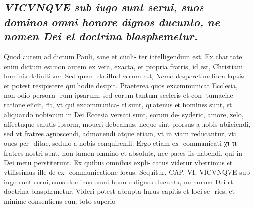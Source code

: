 \documentclass{article}
\begin{document}
\begin{pages}
\subsection*{\textit{VICVNQVE sub iugo sunt serui, suos dominos omni honore dignos ducunto, ne nomen Dei et doctrina blasphemetur.}}Quod autem ad dictum Pauli, sane et ciuili- ter intelligendum est. Ex charitate enim dictum est:non autem ex vera, exacta, et propria fratris, id est, Christiani hominis definitione. Sed quan- do illud verum est, Nemo desperet meliora lapsis et potest resipiscere qui hodie desipit. Praeterea quos excommunicat Ecclesia, non odio persona- rum ipsarum, sed eorum tantum sceleris et con- tumaciae ratione eiicit, fit, vt qui excommunica- ti sunt, quatenus et homines sunt, et aliquando nobiscum in Dei Eccesia versati sunt, eorum de- syderio, amore, zelo, affectuque salutis ipsorm, moueri debeamus, neque sint prorsus a nobis abiiciendi, sed vt fratres agnoscendi, admonendi atque etiam, vt in viam reducantur, vti oues per- ditae, sedulo a nobis conquirendi. Ergo etiam ex- communicati χτ τι fratres nostri sunt, non tamen omnino et absolute, nec pares iis habendi, qui in Dei metu perstiterunt. Ex quibus omnibus expli- catus videtur vberrimus et vtilissimus ille de ex- communicatione locus. Sequitur, CAP. VI. VICVNQVE sub iugo sunt serui, suos dominos omni honore dignos ducunto, ne nomen Dei et doctrina blasphemetur. Videri potest abrupta huius capitis et loci se- ries, et minime consentiens cum toto superio-  \pend
\endnumbering
\end{pages}
\end{document}
